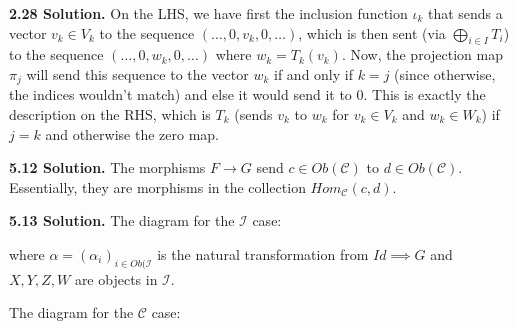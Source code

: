 \textbf{2.28 Solution.} On the LHS, we have first the inclusion function $\iota_k$ that sends a vector $v_k \in V_k$ to the sequence $(\ldots, 0, v_k, 0, \ldots)$, which is then sent (via $\bigoplus_{i \in I}T_i$) to the sequence $(\ldots, 0, w_k, 0, \ldots)$ where $w_k = T_k(v_k)$. Now, the projection map $\pi_j$ will send this sequence to the vector $w_k$ if and only if $k = j$ (since otherwise, the indices wouldn't match) and else it would send it to 0. This is exactly the description on the RHS, which is $T_k$ (sends $v_k$ to $w_k$ for $v_k \in V_k$ and $w_k \in W_k$) if $j = k$ and otherwise the zero map.

\textbf{5.12 Solution.} The morphisms $F \to G$ send $c \in Ob(\mathcal{C})$ to $d \in Ob(\mathcal{C})$. Essentially, they are morphisms in the collection $Hom_{\mathcal{C}}(c, d)$.

\textbf{5.13 Solution.} The diagram for the $\mathcal{I}$ case:

\begin{center}
\end{center}

where $\alpha = (\alpha_i)_{i \in Ob(\mathcal{I}}$ is the natural transformation from $Id \implies G$ and $X, Y, Z, W$ are objects in $\mathcal{I}$.

The diagram for the $\mathcal{C}$ case:
\begin{center}
\end{center}

